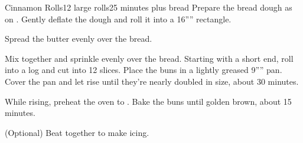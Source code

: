 \documentclass[../Cookbook.tex]{subfiles}
\begin{document}
\begin{recipe}[CinnamonRolls]{Cinnamon Rolls}{12 large rolls}{25 minutes plus bread}
	Prepare the bread dough as on .
	Gently deflate the dough and roll it into a 16'''' rectangle.

	Spread the butter evenly over the bread.

	Mix together and sprinkle evenly over the bread.
	Starting with a short end, roll into a log and cut into 12 slices.
	Place the buns in a lightly greased 9'''' pan.
	Cover the pan and let rise until they're nearly doubled in size, about 30 minutes.

	While rising, preheat the oven to .
	Bake the buns until golden brown, about 15 minutes.

	(Optional) Beat together to make icing.
\end{recipe}
\end{document}
